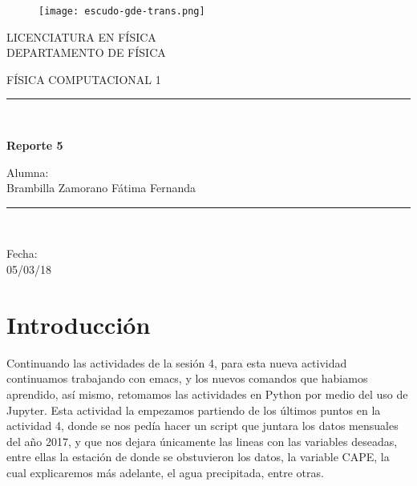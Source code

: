 \documentclass{article}
\begin{document}
\begin{titlepage}
\begin{center}
    \vspace*{-1in}
    \begin{figure}[htb]
    \begin{center}
    \texttt{[image: escudo-gde-trans.png]}
    \end{center}
\end{figure}    
\begin{center}
LICENCIATURA EN FÍSICA \\
\vspace*{0.15in}
DEPARTAMENTO DE FÍSICA \\
\vspace*{0.6in}
\begin{large}
FÍSICA COMPUTACIONAL 1 \\
\end{large}
\vspace*{0.2in}
\rule{80mm}{0.1mm}\\
\vspace*{0.1in}
\begin{large}
\textbf{Reporte 5\\ }
\end{large}
\vspace*{0.3in}
\begin{large}
Alumna: \\
\vspace*{0.1in}
Brambilla Zamorano Fátima Fernanda\\
\end{large}
\vspace*{0.3in}
\rule{80mm}{0.1mm}\\
\vspace*{0.1in}
\begin{large}
Fecha: \\ 05/03/18\\
\end{large}
\end{center}
\end{center}
\end{titlepage}

\section{Introducción}
Continuando las actividades de la sesión 4, para esta nueva actividad continuamos trabajando con emacs, y los nuevos comandos que habiamos aprendido, así mismo, retomamos las actividades en Python por medio del uso de Jupyter. 
Esta actividad la empezamos partiendo de los últimos puntos en la actividad 4, donde se nos pedía hacer un script que juntara los datos mensuales del año 2017, y que nos dejara únicamente las lineas con las variables deseadas, entre ellas la estación de donde se obstuvieron los datos, la variable CAPE, la cual explicaremos más adelante, el agua precipitada, entre otras. 
\end{document}
